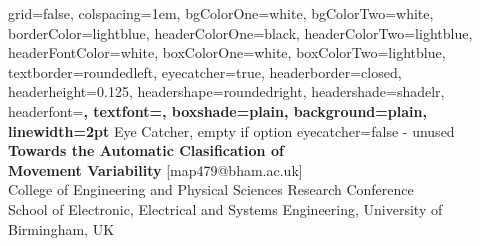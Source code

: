 \documentclass[a0paper,portrait]{baposter}
\begin{document}







\begin{poster}%
  {
  grid=false,
  colspacing=1em,
  bgColorOne=white,
  bgColorTwo=white,
  borderColor=lightblue,
  headerColorOne=black,
  headerColorTwo=lightblue,
  headerFontColor=white,
  boxColorOne=white,
  boxColorTwo=lightblue,
  textborder=roundedleft,
  eyecatcher=true,
  headerborder=closed,
  headerheight=0.125\textheight,
  headershape=roundedright,
  headershade=shadelr,
  headerfont=\Large\bf\textsc, %
  textfont={\setlength{\parindent}{1.5em}},
  boxshade=plain,
  background=plain,
  linewidth=2pt
  }
{
	Eye Catcher, empty if option eyecatcher=false - unused
}
{\bf
  {Towards the Automatic Clasification of \\ Movement Variability}
}
{
 { [map479@bham.ac.uk]  } \\
  {\smaller
  College of Engineering and Physical Sciences Research Conference \\
  }
	{\smaller
	School of Electronic, Electrical and Systems Engineering, University of Birmingham, UK \\
  }
}
  {%
  	\fbox{
    \begin{minipage}{11em}


\end{minipage}}}
\end{poster}
\end{document}

